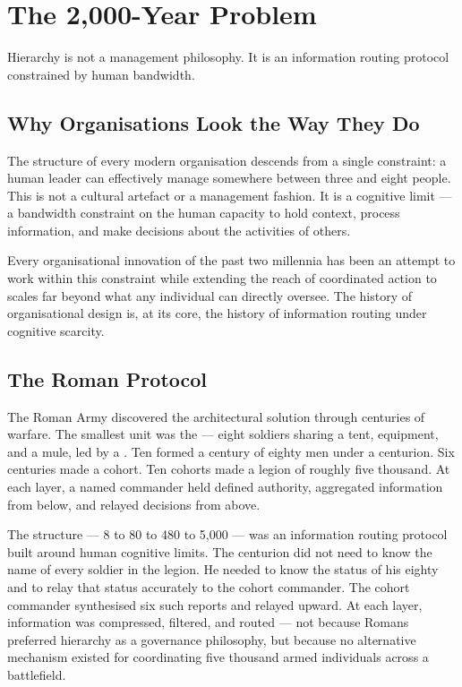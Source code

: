 \chapter{The 2,000-Year Problem}
\label{ch:historical-context}

\epigraph{Hierarchy is not a management philosophy. It is an information routing protocol constrained by human bandwidth.}{}

\section{Why Organisations Look the Way They Do}

The structure of every modern organisation descends from a single constraint: a human leader can effectively manage somewhere between three and eight people. This is not a cultural artefact or a management fashion. It is a cognitive limit --- a bandwidth constraint on the human capacity to hold context, process information, and make decisions about the activities of others.

Every organisational innovation of the past two millennia has been an attempt to work within this constraint while extending the reach of coordinated action to scales far beyond what any individual can directly oversee. The history of organisational design is, at its core, the history of information routing under cognitive scarcity.

\section{The Roman Protocol}

The Roman Army discovered the architectural solution through centuries of warfare. The smallest unit was the  --- eight soldiers sharing a tent, equipment, and a mule, led by a . Ten  formed a century of eighty men under a centurion. Six centuries made a cohort. Ten cohorts made a legion of roughly five thousand. At each layer, a named commander held defined authority, aggregated information from below, and relayed decisions from above.

The structure --- 8 to 80 to 480 to 5,000 --- was an information routing protocol built around human cognitive limits. The centurion did not need to know the name of every soldier in the legion. He needed to know the status of his eighty and to relay that status accurately to the cohort commander. The cohort commander synthesised six such reports and relayed upward. At each layer, information was compressed, filtered, and routed --- not because Romans preferred hierarchy as a governance philosophy, but because no alternative mechanism existed for coordinating five thousand armed individuals across a battlefield.

